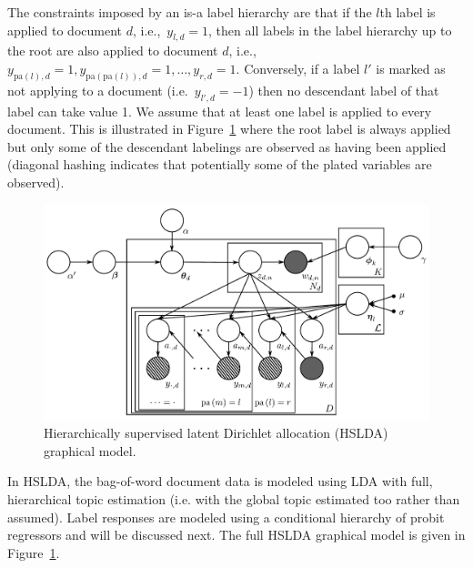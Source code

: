 The constraints imposed by an is-a label hierarchy are that if the $l$th label is applied to document $d$, i.e.,~$y_{l,d} = 1$, then all labels in the label hierarchy up to the root are also applied to document $d$, i.e.,~$y_{\mathrm{pa}(l),d} = 1, y_{\mathrm{pa}(\mathrm{pa}(l)),d} = 1, \ldots, y_{r,d}=1.$  Conversely, if a label $l'$ is marked as not applying to a document (i.e.~$y_{l',d}=-1$) then no descendant label of that label can take value 1.   We assume that at least one label is applied to every document.  This is illustrated in Figure~\ref{fig:graphical_model} where the root label is always applied but only some of the descendant labelings are observed as having been applied (diagonal hashing indicates that potentially some of the plated variables are observed).

%
\begin{figure}[t]
 \centering \includegraphics[scale=0.4]{Chapters/chapter1/Graphical_Model-final} \caption{Hierarchically supervised latent Dirichlet allocation (HSLDA) graphical model.}


\label{fig:graphical_model} 
\end{figure}

In HSLDA, the bag-of-word document data is modeled using LDA with
 full, hierarchical topic estimation (i.e. with the global topic estimated too rather than assumed).
Label responses are modeled using a conditional
hierarchy of probit regressors and will be discussed next. The full HSLDA graphical model is given in
Figure~\ref{fig:graphical_model}.

